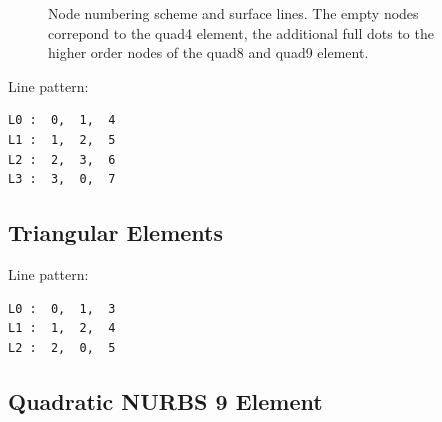 \begin{figure}[h!]
\begin{center}
\caption{Node numbering scheme and surface lines. The empty nodes correpond to the quad4 element, the additional full dots to the higher order nodes of the quad8 and quad9 element.}
\label{fig:conventions:2d}
\end{center}
\end{figure}

Line pattern:
\begin{verbatim}
L0 :  0,  1,  4
L1 :  1,  2,  5
L2 :  2,  3,  6
L3 :  3,  0,  7
\end{verbatim}


\subsection{Triangular Elements}

Line pattern:
\begin{verbatim}
L0 :  0,  1,  3
L1 :  1,  2,  4
L2 :  2,  0,  5
\end{verbatim}

\subsection{Quadratic NURBS 9 Element}

